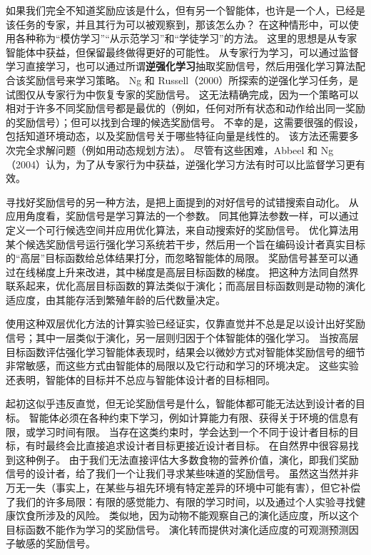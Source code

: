 \documentclass[UTF8, 12pt, fontset=fandol, oneside]{ctexart}
\begin{document}
如果我们完全不知道奖励应该是什么，但有另一个智能体，也许是一个人，已经是该任务的专家，并且其行为可以被观察到，那该怎么办？
在这种情形中，可以使用各种称为“模仿学习”“从示范学习”和“学徒学习”的方法。
这里的思想是从专家智能体中获益，但保留最终做得更好的可能性。
从专家行为学习，可以通过监督学习直接学习，也可以通过所谓\textbf{逆强化学习}抽取奖励信号，然后用强化学习算法配合该奖励信号来学习策略。
Ng 和 Russell（2000）所探索的逆强化学习任务，是试图仅从专家行为中恢复专家的奖励信号。
这无法精确完成，因为一个策略可以相对于许多不同奖励信号都是最优的（例如，任何对所有状态和动作给出同一奖励的奖励信号）；但可以找到合理的候选奖励信号。
不幸的是，这需要很强的假设，包括知道环境动态，以及奖励信号关于哪些特征向量是线性的。
该方法还需要多次完全求解问题（例如用动态规划方法）。
尽管有这些困难，Abbeel 和 Ng（2004）认为，为了从专家行为中获益，逆强化学习方法有时可以比监督学习更有效。

寻找好奖励信号的另一种方法，是把上面提到的对好信号的试错搜索自动化。
从应用角度看，奖励信号是学习算法的一个参数。
同其他算法参数一样，可以通过定义一个可行候选空间并应用优化算法，来自动搜索好的奖励信号。
优化算法用某个候选奖励信号运行强化学习系统若干步，然后用一个旨在编码设计者真实目标的“高层”目标函数给总体结果打分，而忽略智能体的局限。
奖励信号甚至可以通过在线梯度上升来改进，其中梯度是高层目标函数的梯度。
把这种方法同自然界联系起来，优化高层目标函数的算法类似于演化；而高层目标函数则是动物的演化适应度，由其能存活到繁殖年龄的后代数量决定。

使用这种双层优化方法的计算实验已经证实，仅靠直觉并不总是足以设计出好奖励信号；其中一层类似于演化，另一层则归因于个体智能体的强化学习。
当按高层目标函数评估强化学习智能体表现时，结果会以微妙方式对智能体奖励信号的细节非常敏感，而这些方式由智能体的局限以及它行动和学习的环境决定。
这些实验还表明，智能体的目标并不总应与智能体设计者的目标相同。

起初这似乎违反直觉，但无论奖励信号是什么，智能体都可能无法达到设计者的目标。
智能体必须在各种约束下学习，例如计算能力有限、获得关于环境的信息有限，或学习时间有限。
当存在这类约束时，学会达到一个不同于设计者目标的目标，有时最终会比直接追求设计者目标更接近设计者目标。
在自然界中很容易找到这种例子。
由于我们无法直接评估大多数食物的营养价值，演化，即我们奖励信号的设计者，给了我们一个让我们寻求某些味道的奖励信号。
虽然这当然并非万无一失（事实上，在某些与祖先环境有特定差异的环境中可能有害），但它补偿了我们的许多局限：有限的感觉能力、有限的学习时间，以及通过个人实验寻找健康饮食所涉及的风险。
类似地，因为动物不能观察自己的演化适应度，所以这个目标函数不能作为学习的奖励信号。
演化转而提供对演化适应度的可观测预测因子敏感的奖励信号。
\end{document}
